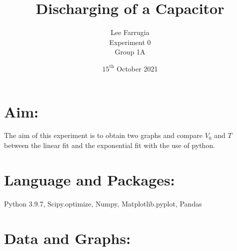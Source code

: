 \documentclass[12pt, a4paper]{article}
\title{Discharging of a Capacitor}
\author{Lee Farrugia \\ Experiment 0 \\ Group 1A}
\date{$15^{\text{th}}$ October 2021}
\begin{document}

\maketitle

\section*{Aim:}
The aim of this experiment is to obtain two graphs and compare $V_0$ and $T$ between the linear fit and the exponential fit with the use of python.

\section*{Language and Packages:}
Python 3.9.7, Scipy.optimize, Numpy, Matplotlib.pyplot, Pandas

\section*{Data and Graphs:}
\end{document}
